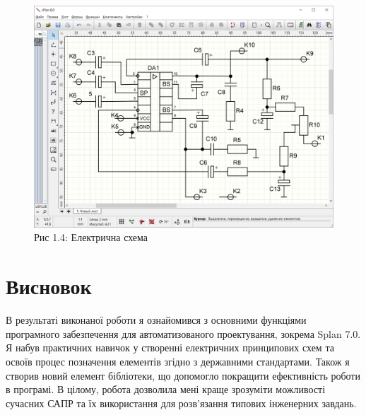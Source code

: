 \documentclass[a4paper]{article}
\begin{document}
    \begin{figure}[h]
        \centering
        \includegraphics[width=1\textwidth]{imgs/LW1_4.png}
        \caption*{Рис 1.4: Електрична схема}
    \end{figure} 

    \newpage 
 
    \section*{Висновок}
    В результаті виконаної роботи я ознайомився з основними функціями програмного забезпечення 
    для автоматизованого проектування, зокрема Splan 7.0. Я набув практичних навичок у створенні 
    електричних принципових схем та освоїв процес позначення елементів згідно з державними стандартами. 
    Також я створив новий елемент бібліотеки, що допомогло покращити ефективність роботи в програмі. 
    В цілому, робота дозволила мені краще зрозуміти можливості сучасних САПР та їх використання для 
    розв'язання типових інженерних завдань.
\end{document}
